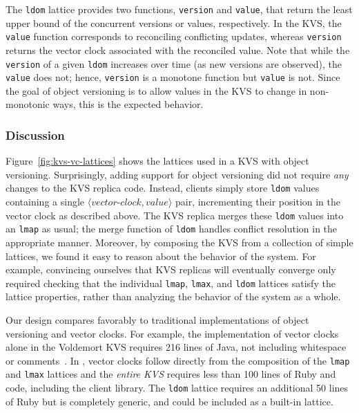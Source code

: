 The \texttt{ldom} lattice provides two functions, \texttt{version} and
\texttt{value}, that return the least upper bound of the concurrent versions or
values, respectively. In the KVS, the \texttt{value} function corresponds to
reconciling conflicting updates, whereas \texttt{version} returns the vector
clock associated with the reconciled value. Note that while the \texttt{version}
of a given \texttt{ldom} increases over time (as new versions are observed), the
\texttt{value} does not; hence, \texttt{version} is a monotone function but
\texttt{value} is not. Since the goal of object versioning is to allow values in
the KVS to change in non-monotonic ways, this is the expected behavior.

\subsubsection{Discussion}
Figure~\ref{fig:kvs-vc-lattices} shows the lattices used in a KVS with object
versioning. Surprisingly, adding support for object versioning did not require
\emph{any} changes to the KVS replica code. Instead, clients simply store
\texttt{ldom} values containing a single
$\langle\textit{vector-clock},\textit{value}\rangle$ pair, incrementing their
position in the vector clock as described above. The KVS replica merges these
\texttt{ldom} values into an \texttt{lmap} as usual; the merge function of
\texttt{ldom} handles conflict resolution in the appropriate manner. Moreover,
by composing the KVS from a collection of simple lattices, we found it easy to
reason about the behavior of the system. For example, convincing ourselves that
KVS replicas will eventually converge only required checking that the individual
\texttt{lmap}, \texttt{lmax}, and \texttt{ldom} lattices satisfy the lattice
properties, rather than analyzing the behavior of the system as a whole.

Our design compares favorably to traditional implementations of object
versioning and vector clocks. For example, the implementation of vector clocks
alone in the Voldemort KVS requires 216 lines of Java, not including whitespace
or comments~\cite{voldemort-vector-clock}. In \lang, vector clocks follow
directly from the composition of the \texttt{lmap} and \texttt{lmax} lattices
and the \emph{entire KVS} requires less than 100 lines of Ruby and \lang code,
including the client library. The \texttt{ldom} lattice requires an additional
50 lines of Ruby but is completely generic, and could be included as a built-in
lattice.

